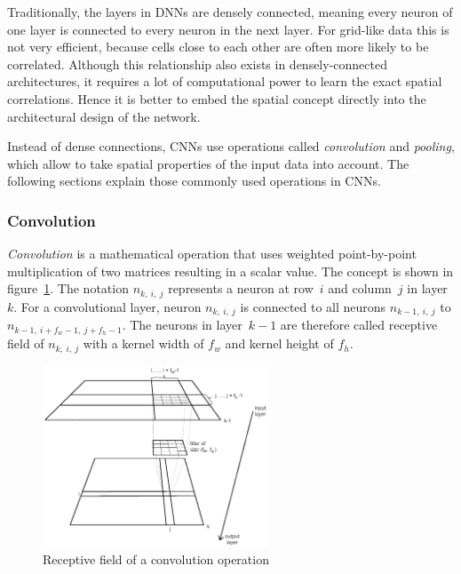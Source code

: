 Traditionally, the layers in DNNs are densely connected, meaning every neuron of one layer is connected to every neuron in the next layer. For grid-like data this is not very efficient, because cells close to each other are often more likely to be correlated. Although this relationship also exists in densely-connected architectures, it requires a lot of computational power to learn the exact spatial correlations. Hence it is better to embed the spatial concept directly into the architectural design of the network.

Instead of dense connections, CNNs use operations called \emph{convolution} and \emph{pooling}, which allow to take spatial properties of the input data into account. The following sections explain those commonly used operations in CNNs.

\subsubsection{Convolution}
\label{sec:convolution}
\emph{Convolution} is a mathematical operation that uses weighted point-by-point multiplication of two matrices resulting in a scalar value. The concept is shown in figure~\ref{fig:convolution}. The notation $n_{k,~i,~j}$ represents a neuron at row~$i$ and column~$j$ in layer~$k$. For a convolutional layer, neuron $n_{k,~i,~j}$ is connected to all neurons $n_{k-1,~i,~j}$ to $n_{k-1,~i + f_w -1,~j + f_h -1}$. The neurons in layer~$k-1$ are therefore called receptive field of $n_{k,~i,~j}$ with a kernel width of $f_w$ and kernel height of $f_h$.~\cite[p.~361 f]{praxiseinstieg_ml17}

\begin{figure}[h]
    \centering
    \includegraphics[width=0.6\textwidth]{images/convolution_template}
    \caption{Receptive field of a convolution operation}
    \label{fig:convolution}
\end{figure}

